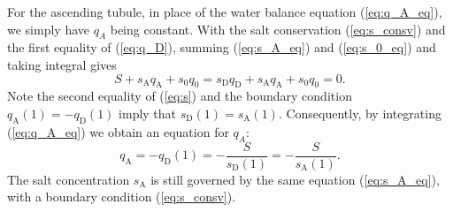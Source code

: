 \documentclass{article}
\numberwithin{equation}{section} %
\begin{document}
For the ascending tubule, in place of the water balance equation (\ref{eq:q_A_eq}), we simply have $q_A$ being constant.
With the salt conservation (\ref{eq:s_consv}) and the first equality of (\ref{eq:q_D}), summing (\ref{eq:s_A_eq}) and (\ref{eq:s_0_eq}) and taking integral gives
\begin{equation}\label{eq:s}
    S+s_\mathrm{A}q_\mathrm{A}+s_0q_0 = s_\mathrm{D}q_\mathrm{D}+s_\mathrm{A}q_\mathrm{A}+s_0q_0 = 0.
\end{equation}
Note the second equality of (\ref{eq:s}) and the boundary condition $q_\mathrm{A}(1) = -q_\mathrm{D}(1)$ imply that $s_\mathrm{D}(1) = s_\mathrm{A}(1)$.
Consequently, by integrating (\ref{eq:q_A_eq}) we obtain an equation for $q_A$:
\begin{equation}\label{eq:q_A}
    q_\mathrm{A} = -q_\mathrm{D}(1) = -\frac{S}{s_\mathrm{D}(1)} = -\frac{S}{s_\mathrm{A}(1)}.
\end{equation}
The salt concentration $s_\mathrm{A}$ is still governed by the same equation (\ref{eq:s_A_eq}), with a boundary condition (\ref{eq:s_consv}).
\end{document}
